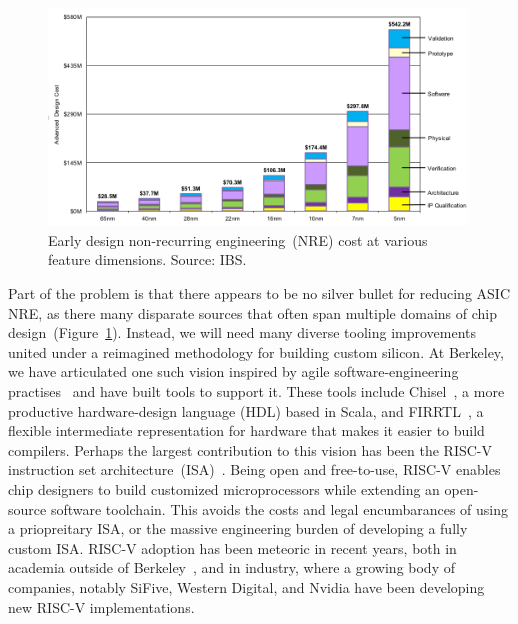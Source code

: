 \begin{figure}
    \centering
    \includegraphics[width=0.99\textwidth]{figures/nre-cost.png}
    \caption{Early design non-recurring engineering~(NRE) cost
    at various feature dimensions. Source: IBS.}
    \label{fig:chip-nre}
\end{figure}

Part of the problem is that there appears to be no silver bullet for reducing
ASIC NRE, as there many disparate sources that often span multiple domains of
chip design~(Figure~\ref{fig:chip-nre}). Instead, we will need many diverse
tooling improvements united under a reimagined methodology for building custom
silicon. At Berkeley, we have articulated one such vision inspired by agile
software-engineering practises~\cite{AgileHW} and have built tools to support it.
These tools include Chisel~\cite{Chisel}, a more productive hardware-design
language (HDL) based in Scala, and FIRRTL~\cite{FIRRTL}, a flexible
intermediate representation for hardware that makes it easier to build
compilers. Perhaps the largest contribution to this vision has been the RISC-V
instruction set architecture~(ISA)~\cite{WatermanDissertation}.  Being open and
free-to-use, RISC-V enables chip designers to build customized microprocessors
while extending an open-source software toolchain.  This avoids the costs and
legal encumbarances of using a priopreitary ISA, or the massive engineering
burden of developing a fully custom ISA. RISC-V adoption has been meteoric in
recent years, both in academia outside of Berkeley~\cite{BlackParrot, Celerity,
Pulp}, and in industry, where a growing body of companies, notably SiFive,
Western Digital, and Nvidia have been developing new RISC-V implementations.

